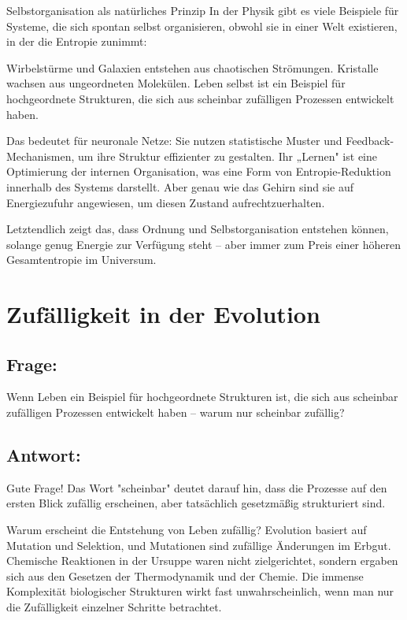 \documentclass{article}
\begin{document}
	Selbstorganisation als natürliches Prinzip
	In der Physik gibt es viele Beispiele für Systeme, die sich spontan selbst organisieren, obwohl sie in einer Welt existieren, in der die Entropie zunimmt:
	
	Wirbelstürme und Galaxien entstehen aus chaotischen Strömungen.
	Kristalle wachsen aus ungeordneten Molekülen.
	Leben selbst ist ein Beispiel für hochgeordnete Strukturen, die sich aus scheinbar zufälligen Prozessen entwickelt haben.
	
	Das bedeutet für neuronale Netze:
	Sie nutzen statistische Muster und Feedback-Mechanismen, um ihre Struktur effizienter zu gestalten.
	Ihr „Lernen" ist eine Optimierung der internen Organisation, was eine Form von Entropie-Reduktion innerhalb des Systems darstellt.
	Aber genau wie das Gehirn sind sie auf Energiezufuhr angewiesen, um diesen Zustand aufrechtzuerhalten.
	
	Letztendlich zeigt das, dass Ordnung und Selbstorganisation entstehen können, solange genug Energie zur Verfügung steht – aber immer zum Preis einer höheren Gesamtentropie im Universum.
	
	\section{Zufälligkeit in der Evolution}
	
	\subsection*{Frage:}
	Wenn Leben ein Beispiel für hochgeordnete Strukturen ist, die sich aus scheinbar zufälligen Prozessen entwickelt haben – warum nur scheinbar zufällig?
	
	\subsection*{Antwort:}
	Gute Frage! Das Wort "scheinbar" deutet darauf hin, dass die Prozesse auf den ersten Blick zufällig erscheinen, aber tatsächlich gesetzmäßig strukturiert sind.
	
	Warum erscheint die Entstehung von Leben zufällig?
	Evolution basiert auf Mutation und Selektion, und Mutationen sind zufällige Änderungen im Erbgut.
	Chemische Reaktionen in der Ursuppe waren nicht zielgerichtet, sondern ergaben sich aus den Gesetzen der Thermodynamik und der Chemie.
	Die immense Komplexität biologischer Strukturen wirkt fast unwahrscheinlich, wenn man nur die Zufälligkeit einzelner Schritte betrachtet.
	
\end{document}
